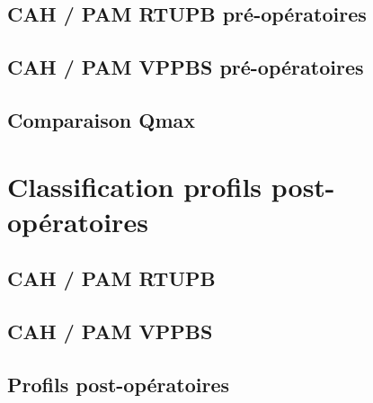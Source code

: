 \documentclass[12pt]{article}
\begin{document}
\subsection{CAH / PAM RTUPB pré-opératoires }
	  
\subsection{CAH / PAM VPPBS  pré-opératoires }
	  
\subsection{Comparaison Qmax }
	  

%


\section{Classification profils post-opératoires}
\subsection{CAH / PAM RTUPB }
	  
\subsection{CAH / PAM VPPBS }
	  
\subsection{Profils post-opératoires}
	  




\end{document}
